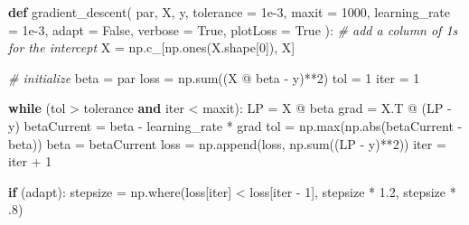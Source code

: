 \documentclass[
  letterpaper,
]{krantz}
\newenvironment{Shaded}{}{}
\newcommand{\BuiltInTok}[1]{\textcolor[rgb]{0.00,0.50,0.00}{#1}}
\newcommand{\CommentTok}[1]{\textcolor[rgb]{0.38,0.63,0.69}{\textit{#1}}}
\newcommand{\ControlFlowTok}[1]{\textcolor[rgb]{0.00,0.44,0.13}{\textbf{#1}}}
\newcommand{\DecValTok}[1]{\textcolor[rgb]{0.25,0.63,0.44}{#1}}
\newcommand{\FloatTok}[1]{\textcolor[rgb]{0.25,0.63,0.44}{#1}}
\newcommand{\KeywordTok}[1]{\textcolor[rgb]{0.00,0.44,0.13}{\textbf{#1}}}
\newcommand{\NormalTok}[1]{#1}
\newcommand{\OperatorTok}[1]{\textcolor[rgb]{0.40,0.40,0.40}{#1}}
\newcommand{\VariableTok}[1]{\textcolor[rgb]{0.10,0.09,0.49}{#1}}
\begin{document}
\begin{Shaded}
\begin{Highlighting}[]
\KeywordTok{def}\NormalTok{ gradient\_descent(}
\NormalTok{    par, }
\NormalTok{    X, }
\NormalTok{    y, }
\NormalTok{    tolerance }\OperatorTok{=} \FloatTok{1e{-}3}\NormalTok{, }
\NormalTok{    maxit }\OperatorTok{=} \DecValTok{1000}\NormalTok{, }
\NormalTok{    learning\_rate }\OperatorTok{=} \FloatTok{1e{-}3}\NormalTok{, }
\NormalTok{    adapt }\OperatorTok{=} \VariableTok{False}\NormalTok{, }
\NormalTok{    verbose }\OperatorTok{=} \VariableTok{True}\NormalTok{, }
\NormalTok{    plotLoss }\OperatorTok{=} \VariableTok{True}
\NormalTok{):}
    \CommentTok{\# add a column of 1s for the intercept}
\NormalTok{    X }\OperatorTok{=}\NormalTok{ np.c\_[np.ones(X.shape[}\DecValTok{0}\NormalTok{]), X]}
    
    \CommentTok{\# initialize}
\NormalTok{    beta }\OperatorTok{=}\NormalTok{ par}
\NormalTok{    loss }\OperatorTok{=}\NormalTok{ np.}\BuiltInTok{sum}\NormalTok{((X }\OperatorTok{@}\NormalTok{ beta }\OperatorTok{{-}}\NormalTok{ y)}\OperatorTok{**}\DecValTok{2}\NormalTok{)}
\NormalTok{    tol }\OperatorTok{=} \DecValTok{1}
    \BuiltInTok{iter} \OperatorTok{=} \DecValTok{1}

    \ControlFlowTok{while}\NormalTok{ (tol }\OperatorTok{\textgreater{}}\NormalTok{ tolerance }\KeywordTok{and} \BuiltInTok{iter} \OperatorTok{\textless{}}\NormalTok{ maxit):}
\NormalTok{        LP }\OperatorTok{=}\NormalTok{ X }\OperatorTok{@}\NormalTok{ beta}
\NormalTok{        grad }\OperatorTok{=}\NormalTok{ X.T }\OperatorTok{@}\NormalTok{ (LP }\OperatorTok{{-}}\NormalTok{ y)}
\NormalTok{        betaCurrent }\OperatorTok{=}\NormalTok{ beta }\OperatorTok{{-}}\NormalTok{ learning\_rate }\OperatorTok{*}\NormalTok{ grad}
\NormalTok{        tol }\OperatorTok{=}\NormalTok{ np.}\BuiltInTok{max}\NormalTok{(np.}\BuiltInTok{abs}\NormalTok{(betaCurrent }\OperatorTok{{-}}\NormalTok{ beta))}
\NormalTok{        beta }\OperatorTok{=}\NormalTok{ betaCurrent}
\NormalTok{        loss }\OperatorTok{=}\NormalTok{ np.append(loss, np.}\BuiltInTok{sum}\NormalTok{((LP }\OperatorTok{{-}}\NormalTok{ y)}\OperatorTok{**}\DecValTok{2}\NormalTok{))}
        \BuiltInTok{iter} \OperatorTok{=} \BuiltInTok{iter} \OperatorTok{+} \DecValTok{1}

        \ControlFlowTok{if}\NormalTok{ (adapt):}
\NormalTok{            stepsize }\OperatorTok{=}\NormalTok{ np.where(loss[}\BuiltInTok{iter}\NormalTok{] }\OperatorTok{\textless{}}\NormalTok{ loss[}\BuiltInTok{iter} \OperatorTok{{-}} \DecValTok{1}\NormalTok{], stepsize }\OperatorTok{*} \FloatTok{1.2}\NormalTok{, stepsize }\OperatorTok{*} \FloatTok{.8}\NormalTok{)}


\end{Highlighting}
\end{Shaded}
\end{document}
